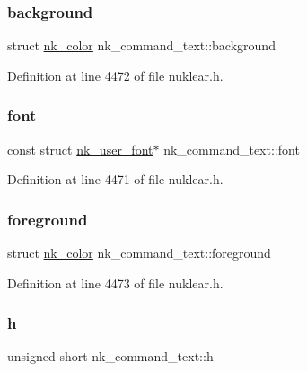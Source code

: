 \subsubsection{\texorpdfstring{background}{background}}
{\footnotesize\ttfamily struct \mbox{\hyperlink{structnk__color}{nk\+\_\+color}} nk\+\_\+command\+\_\+text\+::background}



Definition at line 4472 of file nuklear.\+h.

\mbox{\label{structnk__command__text_a57e049a57f88d08355b6aa929d8e960c}} 
\subsubsection{\texorpdfstring{font}{font}}
{\footnotesize\ttfamily const struct \mbox{\hyperlink{structnk__user__font}{nk\+\_\+user\+\_\+font}}$\ast$ nk\+\_\+command\+\_\+text\+::font}



Definition at line 4471 of file nuklear.\+h.

\mbox{\label{structnk__command__text_a89f088f305fa55471fe85e74d6d7e69c}} 
\subsubsection{\texorpdfstring{foreground}{foreground}}
{\footnotesize\ttfamily struct \mbox{\hyperlink{structnk__color}{nk\+\_\+color}} nk\+\_\+command\+\_\+text\+::foreground}



Definition at line 4473 of file nuklear.\+h.

\mbox{\label{structnk__command__text_ad14a9b2dbadcaee4f9d5de6846e09007}} 
\subsubsection{\texorpdfstring{h}{h}}
{\footnotesize\ttfamily unsigned short nk\+\_\+command\+\_\+text\+::h}




